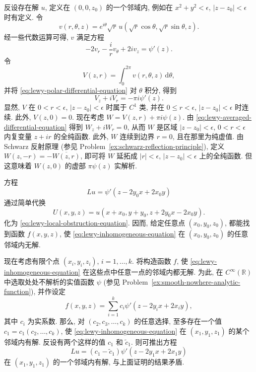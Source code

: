 \begin{Proof}
反设存在解 $u$, 定义在 $(0,0,z_0)$ 的一个邻域内, 例如在 $x^2+y^2<\epsilon$, $|z-z_0|<\epsilon$ 时有定义. 令
\begin{equation}\label{eq:lewy-polar-transformed-function}
v(r,\theta,z)=e^{i\theta}\sqrt r\,u(\sqrt r\cos\theta,\sqrt r\sin\theta,z).
\end{equation}
经一些代数运算可得, $v$ 满足方程
\begin{equation}\label{eq:lewy-polar-differential-equation}
-2v_r-\dfrac irv_\theta+2iv_z=\psi'(z).
\end{equation}
令
\begin{equation}\label{eq:lewy-angular-average}
V(z,r)=\int_0^{2\pi}v(r,\theta,z)\,\mathrm{d}\theta,
\end{equation}
并将 \eqref{eq:lewy-polar-differential-equation} 对 $\theta$ 积分, 得到
\begin{equation}\label{eq:lewy-averaged-differential-equation}
V_z+iV_r=-\pi i\psi'(z).
\end{equation}
显然, $V$ 在 $0<r<\epsilon$, $|z-z_0|<\epsilon$ 时属于 $C^1$ 类, 并在 $0\leq r<\epsilon$, $|z-z_0|<\epsilon$ 时连续. 此外, $V(z,0)=0$. 现在考虑 $W=V(z,r)+\pi i\psi(z)$. 由 \eqref{eq:lewy-averaged-differential-equation} 得到 $W_z+iW_r=0$, 从而 $W$ 是区域 $|z-z_0|<\epsilon$, $0<r<\epsilon$ 内复变量 $z+ir$ 的全纯函数. 此外, $W$ 连续到边界 $r=0$, 且在那里为纯虚值. 由 Schwarz 反射原理 (参见 Problem~\ref{ex:schwarz-reflection-principle}), 定义 $W(z,-r)=-\overline{W(z,r)}$, 即可将 $W$ 延拓成 $|r|<\epsilon$, $|z-z_0|<\epsilon$ 上的全纯函数. 但这意味着 $W(z,0)$ 的虚部 $\pi\psi(z)$ 实解析.
\end{Proof}

方程
\begin{equation}\label{eq:lewy-shifted-forcing}
Lu=\psi'(z-2y_0x+2x_0y)
\end{equation}
通过简单代换
\begin{equation}\label{eq:lewy-coordinate-translation}
U(x,y,z)=u(x+x_0,y+y_0,z+2y_0x-2x_0y).
\end{equation}
化为 \eqref{eq:lewy-local-obstruction-equation}. 因而, 给定任意点 $(x_0,y_0,z_0)$, 都能找到函数 $f(x,y,z)$, 使 \eqref{eq:lewy-inhomogeneous-equation} 在 $(x_0,y_0,z_0)$ 的任意邻域内无解.

现在考虑有限个点 $(x_i,y_i,z_i)$, $i=1,\ldots,k$. 将构造函数 $f$, 使 \eqref{eq:lewy-inhomogeneous-equation} 在这些点中任意一点的邻域内都无解. 为此, 在 $C^\infty(\mathbb{R})$ 中选取处处不解析的实值函数 $\psi$ (参见 Problem~\ref{ex:smooth-nowhere-analytic-function}), 并作设定
\begin{equation}\label{eq:lewy-finitely-many-forcing-centres}
f(x,y,z)=\sum_{i=1}^kc_i\psi'(z-2y_ix+2x_iy),
\end{equation}
其中 $c_i$ 为实系数. 那么, 对 $(c_2,c_3,\ldots,c_k)$ 的任意选择, 至多存在一个值 $c_1=c_1(c_2,\ldots,c_k)$, 使 \eqref{eq:lewy-inhomogeneous-equation} 在 $(x_1,y_1,z_1)$ 的某个邻域内有解. 反设有两个这样的值 $c_1$ 和 $\tilde c_1$. 则可推出方程
\begin{equation}\label{eq:lewy-two-coefficient-contradiction}
Lu=(c_1-\tilde c_1)\psi'(z-2y_1x+2x_1y)
\end{equation}
在 $(x_1,y_1,z_1)$ 的一个邻域内有解, 与上面证明的结果矛盾.

